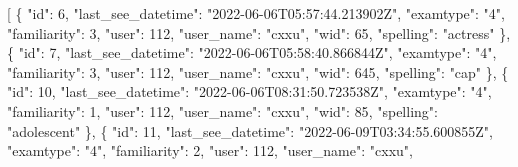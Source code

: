 \documentclass[
]{article}
\newenvironment{Shaded}{}{}
\newcommand{\DataTypeTok}[1]{\textcolor[rgb]{0.56,0.13,0.00}{#1}}
\newcommand{\DecValTok}[1]{\textcolor[rgb]{0.25,0.63,0.44}{#1}}
\newcommand{\FunctionTok}[1]{\textcolor[rgb]{0.02,0.16,0.49}{#1}}
\newcommand{\OtherTok}[1]{\textcolor[rgb]{0.00,0.44,0.13}{#1}}
\newcommand{\StringTok}[1]{\textcolor[rgb]{0.25,0.44,0.63}{#1}}
\begin{document}
\begin{Shaded}
\begin{Highlighting}[]
\OtherTok{[}
  \FunctionTok{\{}
    \DataTypeTok{"id"}\FunctionTok{:} \DecValTok{6}\FunctionTok{,}
    \DataTypeTok{"last\_see\_datetime"}\FunctionTok{:} \StringTok{"2022{-}06{-}06T05:57:44.213902Z"}\FunctionTok{,}
    \DataTypeTok{"examtype"}\FunctionTok{:} \StringTok{"4"}\FunctionTok{,}
    \DataTypeTok{"familiarity"}\FunctionTok{:} \DecValTok{3}\FunctionTok{,}
    \DataTypeTok{"user"}\FunctionTok{:} \DecValTok{112}\FunctionTok{,}
    \DataTypeTok{"user\_name"}\FunctionTok{:} \StringTok{"cxxu"}\FunctionTok{,}
    \DataTypeTok{"wid"}\FunctionTok{:} \DecValTok{65}\FunctionTok{,}
    \DataTypeTok{"spelling"}\FunctionTok{:} \StringTok{"actress"}
  \FunctionTok{\}}\OtherTok{,}
  \FunctionTok{\{}
    \DataTypeTok{"id"}\FunctionTok{:} \DecValTok{7}\FunctionTok{,}
    \DataTypeTok{"last\_see\_datetime"}\FunctionTok{:} \StringTok{"2022{-}06{-}06T05:58:40.866844Z"}\FunctionTok{,}
    \DataTypeTok{"examtype"}\FunctionTok{:} \StringTok{"4"}\FunctionTok{,}
    \DataTypeTok{"familiarity"}\FunctionTok{:} \DecValTok{3}\FunctionTok{,}
    \DataTypeTok{"user"}\FunctionTok{:} \DecValTok{112}\FunctionTok{,}
    \DataTypeTok{"user\_name"}\FunctionTok{:} \StringTok{"cxxu"}\FunctionTok{,}
    \DataTypeTok{"wid"}\FunctionTok{:} \DecValTok{645}\FunctionTok{,}
    \DataTypeTok{"spelling"}\FunctionTok{:} \StringTok{"cap"}
  \FunctionTok{\}}\OtherTok{,}
  \FunctionTok{\{}
    \DataTypeTok{"id"}\FunctionTok{:} \DecValTok{10}\FunctionTok{,}
    \DataTypeTok{"last\_see\_datetime"}\FunctionTok{:} \StringTok{"2022{-}06{-}06T08:31:50.723538Z"}\FunctionTok{,}
    \DataTypeTok{"examtype"}\FunctionTok{:} \StringTok{"4"}\FunctionTok{,}
    \DataTypeTok{"familiarity"}\FunctionTok{:} \DecValTok{1}\FunctionTok{,}
    \DataTypeTok{"user"}\FunctionTok{:} \DecValTok{112}\FunctionTok{,}
    \DataTypeTok{"user\_name"}\FunctionTok{:} \StringTok{"cxxu"}\FunctionTok{,}
    \DataTypeTok{"wid"}\FunctionTok{:} \DecValTok{85}\FunctionTok{,}
    \DataTypeTok{"spelling"}\FunctionTok{:} \StringTok{"adolescent"}
  \FunctionTok{\}}\OtherTok{,}
  \FunctionTok{\{}
    \DataTypeTok{"id"}\FunctionTok{:} \DecValTok{11}\FunctionTok{,}
    \DataTypeTok{"last\_see\_datetime"}\FunctionTok{:} \StringTok{"2022{-}06{-}09T03:34:55.600855Z"}\FunctionTok{,}
    \DataTypeTok{"examtype"}\FunctionTok{:} \StringTok{"4"}\FunctionTok{,}
    \DataTypeTok{"familiarity"}\FunctionTok{:} \DecValTok{2}\FunctionTok{,}
    \DataTypeTok{"user"}\FunctionTok{:} \DecValTok{112}\FunctionTok{,}
    \DataTypeTok{"user\_name"}\FunctionTok{:} \StringTok{"cxxu"}\FunctionTok{,}

\end{Highlighting}
\end{Shaded}
\end{document}
